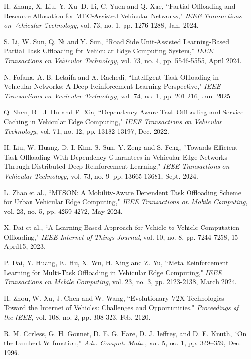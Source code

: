 \documentclass[lettersize,journal]{IEEEtran}
\begin{document}
\begin{thebibliography}{10}
H. Zhang, X. Liu, Y. Xu, D. Li, C. Yuen and Q. Xue, ``Partial Offloading and Resource Allocation for MEC-Assisted Vehicular Networks," \textit{IEEE Transactions on Vehicular Technology}, vol. 73, no. 1, pp. 1276-1288, Jan. 2024.

S. Li, W. Sun, Q. Ni and Y. Sun, ``Road Side Unit-Assisted Learning-Based Partial Task Offloading for Vehicular Edge Computing System," \textit{IEEE Transactions on Vehicular Technology}, vol. 73, no. 4, pp. 5546-5555, April 2024.

N. Fofana, A. B. Letaifa and A. Rachedi, ``Intelligent Task Offloading in Vehicular Networks: A Deep Reinforcement Learning Perspective," \textit{IEEE Transactions on Vehicular Technology}, vol. 74, no. 1, pp. 201-216, Jan. 2025.

Q. Shen, B. -J. Hu and E. Xia, ``Dependency-Aware Task Offloading and Service Caching in Vehicular Edge Computing," \textit{IEEE Transactions on Vehicular Technology}, vol. 71, no. 12, pp. 13182-13197, Dec. 2022.

H. Liu, W. Huang, D. I. Kim, S. Sun, Y. Zeng and S. Feng, ``Towards Efficient Task Offloading With Dependency Guarantees in Vehicular Edge Networks Through Distributed Deep Reinforcement Learning," \textit{IEEE Transactions on Vehicular Technology}, vol. 73, no. 9, pp. 13665-13681, Sept. 2024.

L. Zhao et al., ``MESON: A Mobility-Aware Dependent Task Offloading Scheme for Urban Vehicular Edge Computing," \textit{IEEE Transactions on Mobile Computing}, vol. 23, no. 5, pp. 4259-4272, May 2024.

X. Dai et al., ``A Learning-Based Approach for Vehicle-to-Vehicle Computation Offloading," \textit{IEEE Internet of Things Journal}, vol. 10, no. 8, pp. 7244-7258, 15 April15, 2023.

P. Dai, Y. Huang, K. Hu, X. Wu, H. Xing and Z. Yu, ``Meta Reinforcement Learning for Multi-Task Offloading in Vehicular Edge Computing," \textit{IEEE Transactions on Mobile Computing}, vol. 23, no. 3, pp. 2123-2138, March 2024.

H. Zhou, W. Xu, J. Chen and W. Wang, ``Evolutionary V2X Technologies Toward the Internet of Vehicles: Challenges and Opportunities," \textit{Proceedings of the IEEE}, vol. 108, no. 2, pp. 308-323, Feb. 2020.

R. M. Corless, G. H. Gonnet, D. E. G. Hare, D. J. Jeffrey, and D. E. Knuth, ``On the Lambert W function,” \textit{Adv. Comput. Math.}, vol. 5, no. 1, pp. 329–359, Dec. 1996.


\end{thebibliography}
\end{document}

